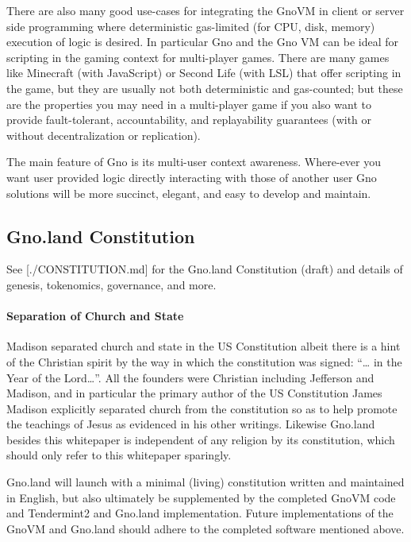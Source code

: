 \documentclass[12pt,a4paper]{article}
\begin{document}
There are also many good use-cases for integrating the GnoVM in client
or server side programming where deterministic gas-limited (for CPU,
disk, memory) execution of logic is desired. In particular Gno and the
Gno VM can be ideal for scripting in the gaming context for multi-player
games. There are many games like Minecraft (with JavaScript) or Second
Life (with LSL) that offer scripting in the game, but they are usually
not both deterministic and gas-counted; but these are the properties you
may need in a multi-player game if you also want to provide
fault-tolerant, accountability, and replayability guarantees (with or
without decentralization or replication).

The main feature of Gno is its multi-user context awareness. Where-ever
you want user provided logic directly interacting with those of another
user Gno solutions will be more succinct, elegant, and easy to develop
and maintain.

\subsection{Gno.land Constitution}\label{gno.land-constitution}

See {[}./CONSTITUTION.md{]} for the Gno.land Constitution (draft) and
details of genesis, tokenomics, governance, and more.

\paragraph{Separation of Church and
State}\label{separation-of-church-and-state}

Madison separated church and state in the US Constitution albeit there
is a hint of the Christian spirit by the way in which the constitution
was signed: ``\ldots{} in the Year of the Lord\ldots{}''. All the
founders were Christian including Jefferson and Madison, and in
particular the primary author of the US Constitution James Madison
explicitly separated church from the constitution so as to help promote
the teachings of Jesus as evidenced in his other writings. Likewise
Gno.land besides this whitepaper is independent of any religion by its
constitution, which should only refer to this whitepaper sparingly.

Gno.land will launch with a minimal (living) constitution written and
maintained in English, but also ultimately be supplemented by the
completed GnoVM code and Tendermint2 and Gno.land implementation. Future
implementations of the GnoVM and Gno.land should adhere to the completed
software mentioned above.
\end{document}
